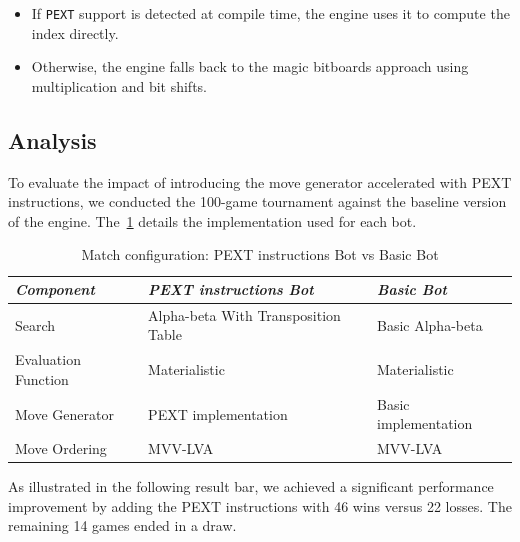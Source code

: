 \begin{itemize}[itemsep=1pt]
  \item If \texttt{PEXT} support is detected at compile time, the engine uses it to compute the index directly.
  \item Otherwise, the engine falls back to the magic bitboards approach using multiplication and bit shifts.
\end{itemize}

\subsection{Analysis}

\noindent To evaluate the impact of introducing the move generator accelerated with PEXT instructions, we conducted the 100-game tournament against the baseline version of the engine. The~\cref{tab:pext_vs_basic} details the implementation used for each bot.

\vspace{1em}

\begin{table}
    \centering
    \begin{tabular}{|p{4cm}|p{4cm}|p{4cm}|}
    \hline
    \textit{Component}         & \textit{PEXT instructions Bot}  & \textit{Basic Bot}     \\ \hline
    Search                     & Alpha-beta With Transposition Table          & Basic Alpha-beta           \\ \hline
    Evaluation Function        & Materialistic                      & Materialistic       \\ \hline
    Move Generator             & PEXT implementation              & Basic implementation   \\ \hline
    Move Ordering              & MVV-LVA                           & MVV-LVA                \\ \hline
    \end{tabular}
    \caption{Match configuration: PEXT instructions Bot vs Basic Bot}\label{tab:pext_vs_basic}
\end{table}

\noindent As illustrated in the following result bar, we achieved a significant performance improvement by adding the PEXT instructions with 46 wins versus 22 losses. The remaining 14 games ended in a draw.

\begin{center}
\medskip
\end{center}

